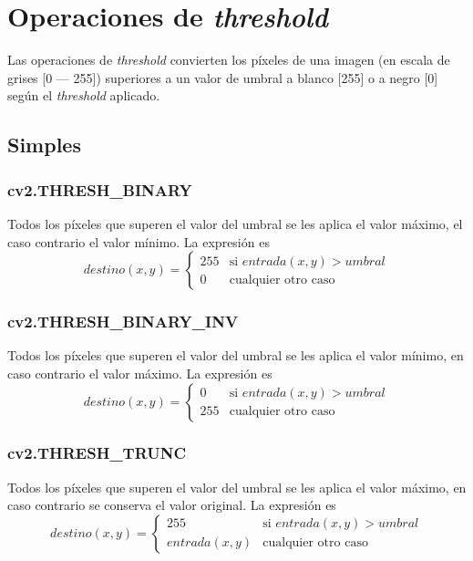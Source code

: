 \section{Operaciones de \emph{threshold}}
Las operaciones de \emph{threshold} convierten los píxeles de una
imagen (en escala de grises [0 --- 255]) superiores a un valor de
umbral a blanco [255] o a negro [0] según el \emph{threshold}
aplicado.
\subsection{Simples}
\subsubsection{cv2.THRESH\_BINARY}
Todos los píxeles que superen el valor del umbral se les aplica el
valor máximo, el caso contrario el valor mínimo. La expresión es
\begin{equation*}
  destino(x, y) =
  \begin{cases}
    255 & \text{si } entrada(x, y) > umbral \\
    0 & \text{cualquier otro caso}
  \end{cases}
\end{equation*}
\subsubsection{cv2.THRESH\_BINARY\_INV}
Todos los píxeles que superen el valor del umbral se les aplica el
valor mínimo, en caso contrario el valor máximo. La expresión es
\begin{equation*}
  destino(x, y) =
  \begin{cases}
    0 & \text{si } entrada(x, y) > umbral \\
    255 & \text{cualquier otro caso}
  \end{cases}
\end{equation*}
\subsubsection{cv2.THRESH\_TRUNC}
Todos los píxeles que superen el valor del umbral se les aplica el
valor máximo, en caso contrario se conserva el valor original. La
expresión es
\begin{equation*}
  destino(x, y) =
  \begin{cases}
    255 & \text{si } entrada(x, y) > umbral \\
    entrada(x, y) & \text{cualquier otro caso}
  \end{cases}
\end{equation*}
